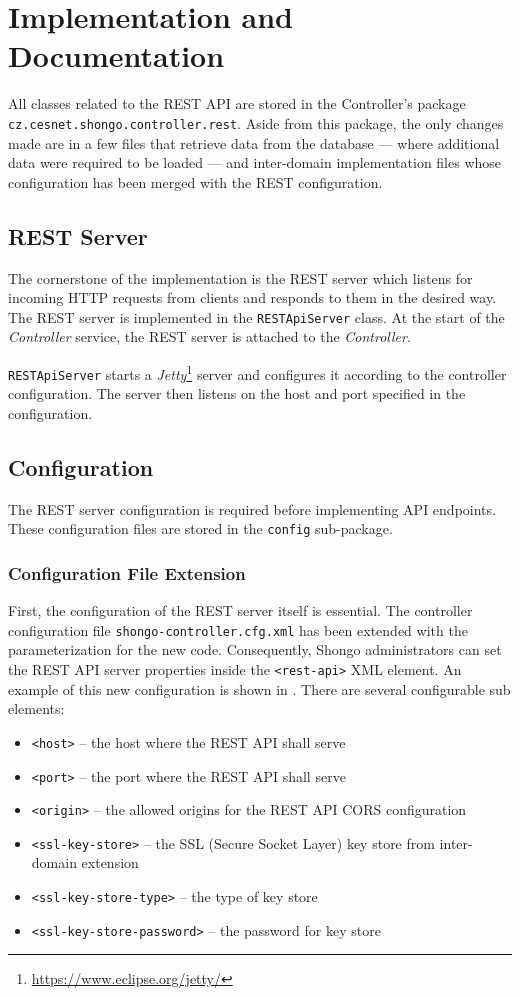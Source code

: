 \chapter{Implementation and Documentation} \label{cha:implementation}
All classes related to the REST API are stored in the Controller’s package  \texttt{cz.cesnet.shongo.controller.rest}.
Aside from this package, the only changes made are in a few files that retrieve data from the database --- where additional data were required to be loaded --- and inter-domain implementation files\cite{pavelka2016shongo} whose configuration has been merged with the REST configuration.

\section{REST Server}
The cornerstone of the implementation is the REST server which listens for incoming HTTP requests from clients and responds to them in the desired way. The REST server is implemented in the \texttt{RESTApiServer} class.
At the start of the \emph{Controller} service, the REST server is attached to the \emph{Controller}.

\texttt{RESTApiServer} starts a \emph{Jetty}\footnote{\url{https://www.eclipse.org/jetty/}} server and configures it according to the controller configuration. The server then listens on the host and port specified in the configuration.

\section{Configuration}
The REST server configuration is required before implementing API endpoints. These configuration files are stored in the \texttt{config} sub-package.

\subsection{Configuration File Extension}
First, the configuration of the REST server itself is essential. The controller configuration file \texttt{shongo-controller.cfg.xml} has been extended with the parameterization for the new code. Consequently, Shongo administrators can set the REST API server properties inside the \texttt{<rest-api>} XML element. An example of this new configuration is shown in . There are several configurable sub elements:
\begin{itemize}
    \item \texttt{<host>} -- the host where the REST API shall serve
    \item \texttt{<port>} -- the port where the REST API shall serve
    \item \texttt{<origin>} -- the allowed origins for the REST API CORS configuration
    \item \texttt{<ssl-key-store>} -- the SSL (Secure Socket Layer) key store from inter-domain extension \cite{pavelka2016shongo}
    \item \texttt{<ssl-key-store-type>} -- the type of key store
    \item \texttt{<ssl-key-store-password>} -- the password for key store
\end{itemize}

